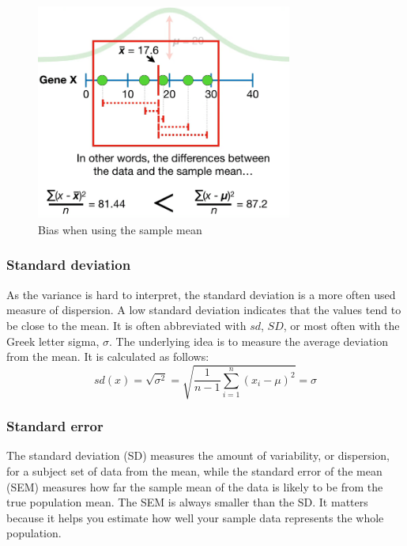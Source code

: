 \documentclass[
  12pt,
  oneside]{book}
\theoremstyle{definition}
\theoremstyle{definition}
\theoremstyle{definition}
\theoremstyle{definition}
\theoremstyle{remark}
\begin{document}
\begin{figure}
\centering
\includegraphics[width=0.75\textwidth,height=\textheight]{fig/bessel.png}
\caption[\label{fig:bessel} Bias when using the sample mean]{\label{fig:bessel} Bias when using the sample mean\footnotemark{}}
\end{figure}

\hypertarget{standard-deviation}{%
\subsubsection{Standard deviation}\label{standard-deviation}}

As the variance is hard to interpret, the standard deviation is a more often used measure of dispersion.
A low standard deviation indicates that the values tend to be close to the mean.
It is often abbreviated with \(sd\), \(SD\), or most often with the Greek letter sigma, \(\sigma\).
The underlying idea is to measure the average deviation from the mean.
It is calculated as follows:
\[
sd(x)=\sqrt{\sigma^2}={\sqrt {{\frac {1}{n-1}}\sum _{i=1}^{n}\left(x_{i}-{\mu}\right)^{2}}}=\sigma
\]

\hypertarget{standard-error}{%
\subsubsection{Standard error}\label{standard-error}}

The standard deviation (SD) measures the amount of variability, or dispersion, for a subject set of data from the mean, while the standard error of the mean (SEM) measures how far the sample mean of the data is likely to be from the true population mean. The SEM is always smaller than the SD. It matters because it helps you estimate how well your sample data represents the whole population.
\end{document}

